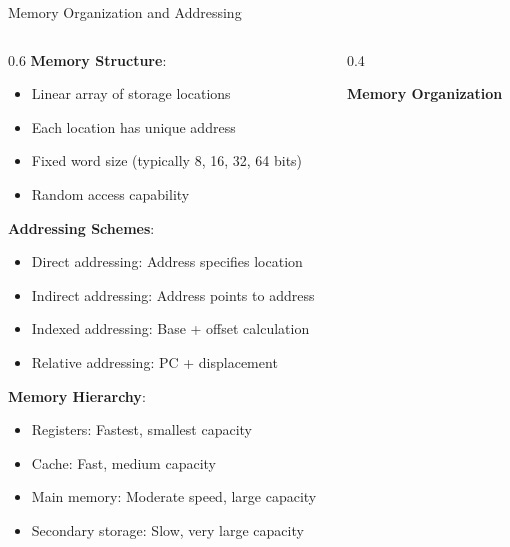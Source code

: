 \documentclass[aspectratio=169]{beamer}
\newcommand{\concept}[1]{\textbf{\color{darkblue}#1}}
\begin{document}
\begin{frame}{Memory Organization and Addressing}
\begin{columns}
\begin{column}{0.6\textwidth}
\concept{Memory Structure}:
\begin{itemize}
\item Linear array of storage locations
\item Each location has unique address
\item Fixed word size (typically 8, 16, 32, 64 bits)
\item Random access capability
\end{itemize}

\vspace{0.3cm}
\concept{Addressing Schemes}:
\begin{itemize}
\item Direct addressing: Address specifies location
\item Indirect addressing: Address points to address
\item Indexed addressing: Base + offset calculation
\item Relative addressing: PC + displacement
\end{itemize}

\vspace{0.3cm}
\concept{Memory Hierarchy}:
\begin{itemize}
\item Registers: Fastest, smallest capacity
\item Cache: Fast, medium capacity
\item Main memory: Moderate speed, large capacity
\item Secondary storage: Slow, very large capacity
\end{itemize}
\end{column}
\begin{column}{0.4\textwidth}
\begin{center}
\textbf{Memory Organization}
\vspace{0.3cm}

\end{center}
\end{column}
\end{columns}
\end{frame}
\end{document}
